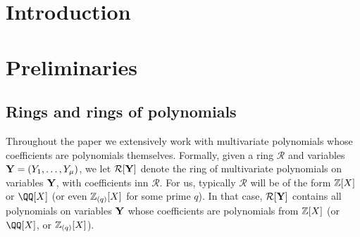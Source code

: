 \documentclass[11pt,letterpaper,usenames,dvipsnames]{article}
\title{\stylizedtitle}
\author{
	Albert Garreta, Psi Vesely, Arantxa Zapico
}
\date{\today}
\begin{document}
\maketitle

\begin{abstract}
\end{abstract}

\setcounter{tocdepth}{3}
\begin{spacing}{0.8}
{\footnotesize \tableofcontents}
\end{spacing}
\newcommand{\cR}{\mathcal{R}}

\section{Introduction}
\label{sec:introduction}


\section{Preliminaries}
\label{sec:preliminaries}

        

\subsection{Rings and rings of polynomials} Throughout the paper we extensively work with multivariate polynomials whose coefficients are polynomials themselves. Formally, given a ring $\cR$ and variables $\mathbf{Y}=(Y_1,\ldots, Y_\mu)$, we let $\cR[\YY]$ denote the ring of multivariate polynomials on variables $\mathbf{Y}$, with coefficients inn $\cR$. For us, typically $\cR$ will be of the form $\mathbb{Z}[X]$ or $\QQ[X]$ (or even $\mathbb{Z}_{(q)}[X]$ for some prime $q$). In that case, $\cR[\YY]$ contains all polynomials on variables $\mathbf{Y}$ whose coefficients are polynomials from $\mathbb{Z}[X]$ (or $\QQ[X]$, or $\mathbb{Z}_{(q)}[X]$). 
\end{document}
